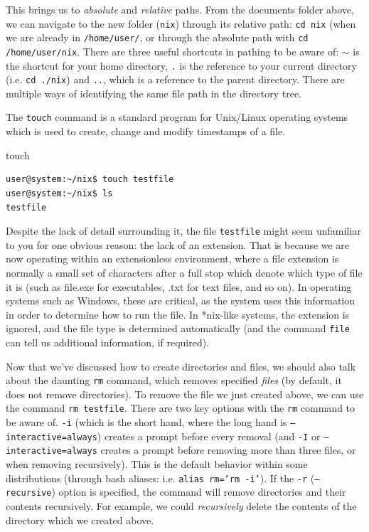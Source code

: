 \documentclass[11pt]{article}
\begin{document}
This brings us to \emph{absolute} and \emph{relative} paths. From the documents folder above, we can navigate to the new folder (\texttt{nix}) through its relative path: \texttt{cd nix} (when we are already in \texttt{/home/user/}, or through the absolute path with \texttt{cd /home/user/nix}. There are three useful shortcuts in pathing to be aware of: $\sim$ is the shortcut for your home directory, \texttt{.} is the reference to your current directory (i.e. \texttt{cd ./nix}) and \texttt{..}, which is a reference to the parent directory. There are multiple ways of identifying the same file path in the directory tree.

The \texttt{touch} command is a standard program for Unix/Linux operating systems which is used to create, change and modify timestamps of a file.\\

\begin{listing}[H]
\caption{touch}\vspace{-0.1in}
\begin{verbatim}
user@system:~/nix$ touch testfile
user@system:~/nix$ ls
testfile
\end{verbatim}
\end{listing}

Despite the lack of detail surrounding it, the file \texttt{testfile} might seem unfamiliar to you for one obvious reason: the lack of an extension. That is because we are now operating within an extensionless environment, where a file extension is normally a small set of characters after a full stop which denote which type of file it is (such as file.exe for executables, .txt for text files, and so on). In operating systems such as Windows, these are critical, as the system uses this information in order to determine how to run the file. In *nix-like systems, the extension is ignored, and the file type is determined automatically (and the command \texttt{file} can tell us additional information, if required).

Now that we've discussed how to create directories and files, we should also talk about the daunting \texttt{rm} command, which removes specified \emph{files} (by default, it does not remove directories). To remove the file we just created above, we can use the command \texttt{rm testfile}. There are two key options with the \texttt{rm} command to be aware of. \texttt{-i} (which is the short hand, where the long hand is \texttt{--interactive=always}) creates a prompt before every removal (and \texttt{-I} or \texttt{--interactive=always} creates a prompt before removing more than three files, or when removing recursively). This is the default behavior within some distributions (through bash aliases: i.e. \texttt{alias rm='rm -i'}). If the \texttt{-r} (\texttt{--recursive}) option is specified, the command will remove directories and their contents recursively. For example, we could \emph{recursively} delete the contents of the directory which we created above. \\
\end{document}
